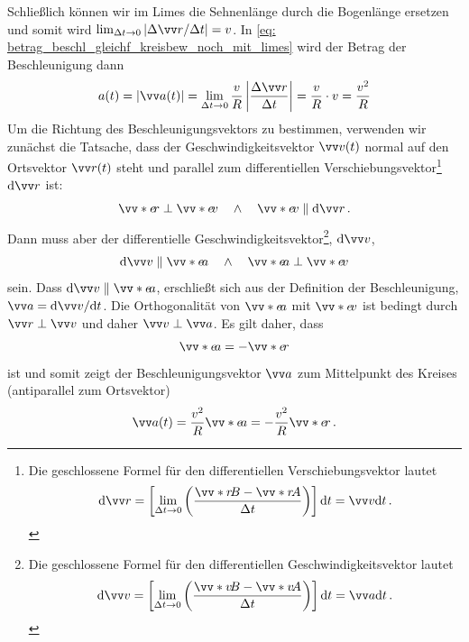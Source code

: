 Schließlich können wir im Limes die Sehnenlänge durch die Bogenlänge ersetzen und somit wird $\lim_{\Delta t \to 0} |\Delta \ivec{r}/\Delta t| = v$. In \cref{eq: betrag_beschl_gleichf_kreisbew_noch_mit_limes} wird der Betrag der Beschleunigung dann
\begin{equation}
    a(t) = |\ivec{a}(t)| = \lim_{\Delta t \to 0} \frac{v}{R} \left| \frac{\Delta \ivec{r}}{\Delta t} \right|  = \frac{v}{R} \cdot v = \frac{v^2}{R}
\end{equation}
Um die Richtung des Beschleunigungsvektors zu bestimmen, verwenden wir zunächst die Tatsache, dass der Geschwindigkeitsvektor $\ivec{v}(t)$ normal auf den Ortsvektor $\ivec{r}(t)$ steht und parallel zum differentiellen Verschiebungsvektor\footnote{Die geschlossene Formel für den differentiellen Verschiebungsvektor lautet \begin{equation}
    \dd \ivec{r} =  \left[\lim_{\Delta t \to 0} \left(\frac{\ivecS{r}{B} - \ivecS{r}{A}}{\Delta t}\right)\right] \dd t = \ivec{v} \dd t \mDot
\end{equation}} $\dd \ivec{r}$ ist: 
\begin{equation}\label{eq: er_perp_ev_parallel_dr}
    \ivecS{e}{r} \perp \ivecS{e}{v} \quad\mAND\quad \ivecS{e}{v} \parallel \dd \ivec{r} \mDot
\end{equation}
Dann muss aber der differentielle Geschwindigkeitsvektor\footnote{Die geschlossene Formel für den differentiellen Geschwindigkeitsvektor lautet \begin{equation}
    \dd \ivec{v} =  \left[\lim_{\Delta t \to 0} \left(\frac{\ivecS{v}{B} - \ivecS{v}{A}}{\Delta t}\right)\right] \dd t = \ivec{a} \dd t \mDot
\end{equation}}, $\dd \ivec{v}$,
\begin{equation}
    \dd \ivec{v} \parallel \ivecS{e}{a} \quad\mAND\quad \ivecS{e}{a} \perp \ivecS{e}{v}
\end{equation}
sein. Dass $\dd \ivec{v} \parallel \ivecS{e}{a}$, erschließt sich aus der Definition der Beschleunigung, $\ivec{a} = \dd \ivec{v}/\dd t$. Die Orthogonalität von $\ivecS{e}{a}$ mit $\ivecS{e}{v}$ ist bedingt durch $\ivec{r} \perp \ivec{v}$ und daher $\ivec{v} \perp \ivec{a}$. Es gilt daher, dass 
\begin{equation}
    \ivecS{e}{a} = -\ivecS{e}{r} 
\end{equation}
ist und somit zeigt der Beschleunigungsvektor $\ivec{a}$ zum Mittelpunkt des Kreises (antiparallel zum Ortsvektor) 
\begin{equation}
    \ivec{a}(t) = \frac{v^2}{R} \ivecS{e}{a} = -\frac{v^2}{R} \ivecS{e}{r}\mDot
\end{equation}



